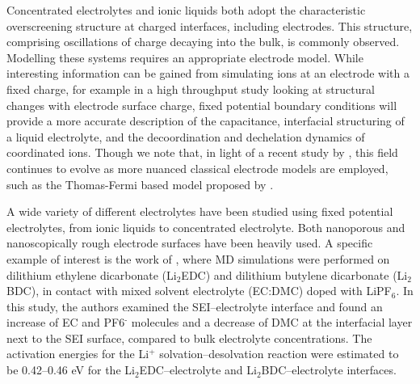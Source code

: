 \documentclass[../main.tex]{subfiles}
\begin{document}
Concentrated electrolytes and ionic liquids both adopt the characteristic overscreening structure at charged interfaces, including electrodes. This structure, comprising oscillations of charge decaying into the bulk, is commonly observed.\cite{coles_simulation_2019,merlet_simulating_2013} Modelling these systems requires an appropriate electrode model. While interesting information can be gained from simulating ions at an electrode with a fixed charge, for example in a high throughput study looking at structural changes with electrode surface charge,\cite{coles_simulation_2019} fixed potential boundary conditions will provide a more accurate description of the capacitance, \cite{merlet_simulating_2013, scalfi_semiclassical_2020} interfacial structuring of a liquid electrolyte,\cite{coles_simulation_2019, vatamanu_ramifications_2017, li_capacitive_2018} and the decoordination and dechelation dynamics of coordinated ions.\cite{vatamanu_molecular_2009} Though we note that, in light of a recent study by \citeauthor{scalfi_semiclassical_2020}, this field continues to evolve as more nuanced classical electrode models are employed, such as the Thomas-Fermi based model proposed by \citeauthor{scalfi_semiclassical_2020}. \cite{scalfi_semiclassical_2020}

A wide variety of different electrolytes have been studied using fixed potential electrolytes, from ionic liquids to concentrated electrolyte. Both nanoporous \cite{merlet_highly_2013, merlet_molecular_2012, vatamanu_molecular_2009, vatamanu_ramifications_2017} and nanoscopically rough electrode surfaces have been heavily used.\cite{vatamanu_influence_2011} A specific example of interest is the work of \citeauthor{borodin_interfacial_2014}, where MD simulations were performed on dilithium ethylene dicarbonate (Li$_2$EDC) and dilithium butylene dicarbonate (Li$_2$BDC), in contact with mixed solvent electrolyte (EC:DMC) doped with LiPF$_6$.\cite{borodin_interfacial_2014} In this study, the authors examined the SEI–electrolyte interface and found an increase of EC and PF6$^{\text{-}}$ molecules and a decrease of DMC at the interfacial layer next to the SEI surface, compared to bulk electrolyte concentrations. The activation energies for the Li$^{+}$ solvation–desolvation reaction were estimated to be 0.42--0.46 eV for the Li$_2$EDC–electrolyte and Li$_2$BDC–electrolyte interfaces.

 \citeauthor{Simoncelli_2018} \cite{Simoncelli_2018}  \citeauthor{li_capacitive_2018} \cite{li_capacitive_2018}
    
\end{document}
